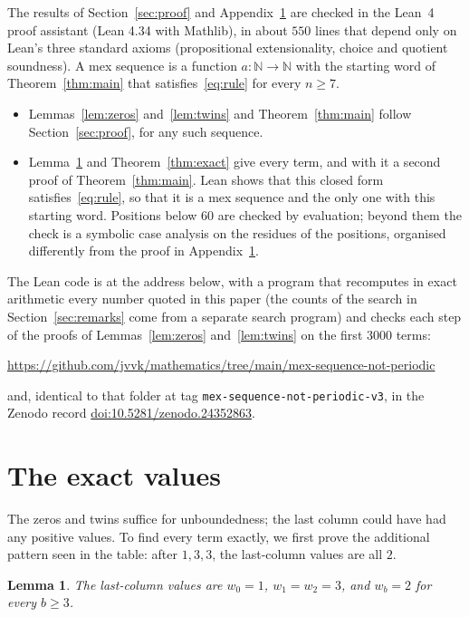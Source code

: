 \documentclass[11pt]{amsart}
\newtheorem{lemma}{Lemma}
\theoremstyle{remark}
\begin{document}
The results of Section~\ref{sec:proof} and Appendix~\ref{sec:exact} are checked in the Lean~4 proof assistant (Lean 4.34 with Mathlib), in about $550$ lines that depend only on Lean's three standard axioms (propositional extensionality, choice and quotient soundness). A mex sequence is a function $a:\mathbb{N}\to\mathbb{N}$ with the starting word of Theorem~\ref{thm:main} that satisfies~\eqref{eq:rule} for every $n\ge7$.
\begin{itemize}
\item Lemmas~\ref{lem:zeros} and~\ref{lem:twins} and Theorem~\ref{thm:main} follow Section~\ref{sec:proof}, for any such sequence.
\item Lemma~\ref{lem:last} and Theorem~\ref{thm:exact} give every term, and with it a second proof of Theorem~\ref{thm:main}. Lean shows that this closed form satisfies~\eqref{eq:rule}, so that it is a mex sequence and the only one with this starting word. Positions below $60$ are checked by evaluation; beyond them the check is a symbolic case analysis on the residues of the positions, organised differently from the proof in Appendix~\ref{sec:exact}.
\end{itemize}
The Lean code is at the address below, with a program that recomputes in exact arithmetic every number quoted in this paper (the counts of the search in Section~\ref{sec:remarks} come from a separate search program) and checks each step of the proofs of Lemmas~\ref{lem:zeros} and~\ref{lem:twins} on the first $3000$ terms:
\begin{center}\small\url{https://github.com/jvvk/mathematics/tree/main/mex-sequence-not-periodic}\end{center}
and, identical to that folder at tag \texttt{mex-sequence-not-periodic-v3}, in the Zenodo record \href{https://doi.org/10.5281/zenodo.24352863}{doi:10.5281/zenodo.24352863}.

\appendix

\section{The exact values}\label{sec:exact}

The zeros and twins suffice for unboundedness; the last column could have had any positive values. To find every term exactly, we first prove the additional pattern seen in the table: after $1,3,3$, the last-column values are all $2$.

\begin{lemma}\label{lem:last}
The last-column values are $w_0=1$, $w_1=w_2=3$, and $w_b=2$ for every $b\ge3$.
\end{lemma}
\end{document}
